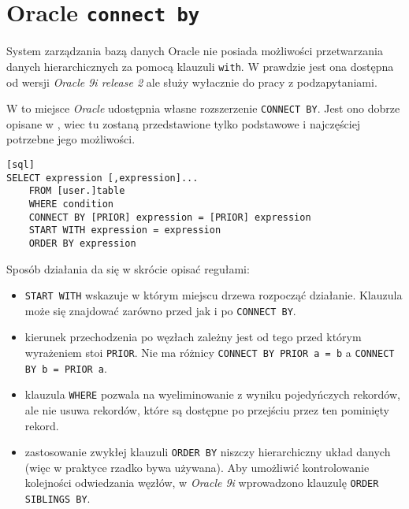\section{Oracle \texttt{connect by}}






System zarządzania bazą danych Oracle nie posiada możliwości przetwarzania danych hierarchicznych za pomocą klauzuli \texttt{with}.
W prawdzie jest ona dostępna od wersji \emph{Oracle 9i release 2} ale służy wyłacznie do pracy z podzapytaniami.

W to miejsce \emph{Oracle} udostępnia własne rozszerzenie \texttt{CONNECT BY}. 
Jest ono dobrze opisane w \cite{oracle-ref11}, wiec tu zostaną przedstawione tylko podstawowe i najczęściej potrzebne jego możliwości.



\begin{verbatim}[sql]
SELECT expression [,expression]...
    FROM [user.]table
    WHERE condition
    CONNECT BY [PRIOR] expression = [PRIOR] expression
    START WITH expression = expression
    ORDER BY expression
\end{verbatim}


Sposób działania da się w skrócie opisać regułami:
\begin{itemize}
    \item \texttt{START WITH} wskazuje w którym miejscu drzewa rozpocząć działanie. 
        Klauzula może się znajdować zarówno przed jak i po \texttt{CONNECT BY}.
    \item kierunek przechodzenia po węzłach zależny jest od tego przed którym wyrażeniem stoi \texttt{PRIOR}.
         Nie ma różnicy \verb|CONNECT BY PRIOR a = b| a \verb|CONNECT BY b = PRIOR a|.
    \item klauzula \texttt{WHERE} pozwala na wyeliminowanie z wyniku pojedyńczych rekordów, 
        ale nie usuwa rekordów, które są dostępne po przejściu przez ten pominięty rekord.
    \item zastosowanie zwykłej klauzuli \texttt{ORDER BY} niszczy hierarchiczny układ danych 
        (więc w praktyce rzadko bywa używana).
        Aby umożliwić kontrolowanie kolejności odwiedzania węzłów, 
        w \emph{Oracle 9i} wprowadzono klauzulę \texttt{ORDER SIBLINGS BY}.
\end{itemize}


